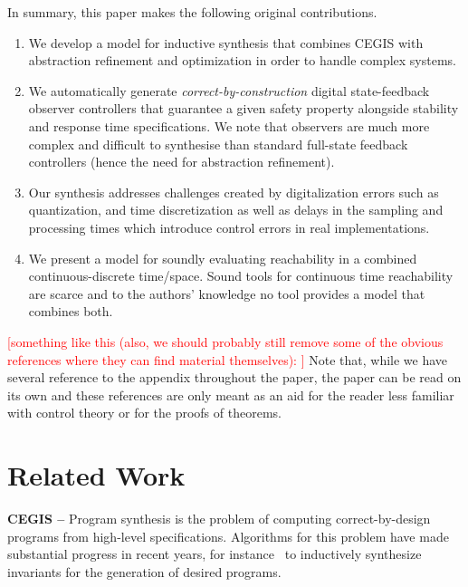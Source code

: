 \documentclass[sigconf]{llncs}
\renewcommand{\note}[1]{\textcolor{red}{[#1]}}
\begin{document}
In summary, this paper makes the following original contributions.
%
\begin{enumerate}
\item We develop a model for inductive synthesis that combines CEGIS with
  abstraction refinement and optimization in order to handle complex
  systems. 
%
\item We automatically generate \emph{correct-by-construction} digital
  state-feedback observer controllers that guarantee a given safety property
  alongside stability and response time specifications.  We note that
  observers are much more complex and difficult to synthesise than standard
  full-state feedback controllers (hence the need for abstraction refinement).
%
\item  Our synthesis addresses challenges created by digitalization errors
 such as quantization, and time discretization as well as delays in the
 sampling and processing times which introduce control errors in real
 implementations.
 \item We present a model for soundly evaluating reachability in a combined 
 continuous-discrete time/space. Sound tools for continuous time reachability 
 are scarce and to the authors' knowledge no tool provides a model that 
 combines both. 
\end{enumerate}

\note{something like this (also, we should probably still remove some of the obvious references where they can find material themselves): }
Note that, while we have several reference to the appendix throughout
the paper, the paper can be read on its own and these references are
only meant as an aid for the reader less familiar with control theory or
for the proofs of theorems.

\section{Related Work}
\label{sec:relw}

\textbf{CEGIS --}
Program synthesis is the problem of computing correct-by-design programs
from high-level specifications.  Algorithms for this problem have made
substantial progress in recent years, for instance~\cite{itzhaky2010simple}
to inductively synthesize invariants for the generation of desired programs.
\end{document}
